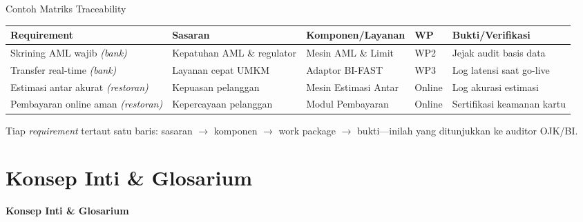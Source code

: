 \documentclass[aspectratio=169, table]{beamer}
\newcommand{\sectionframe}[1]{%
  \begin{frame}{\hfill}
    \centering
    \Huge{\textbf{#1}}
  \end{frame}
}
\newcommand{\takeaway}[1]{%
  \vspace{4pt}
  {\footnotesize #1}
}
\begin{document}
\begin{frame}{Contoh Matriks Traceability}
  \vspace{4pt}
  \scriptsize
  {\setlength{\arrayrulewidth}{0.3pt}%
  \renewcommand{\arraystretch}{1.3}%
  \begin{tabularx}{\textwidth}{@{}|p{}|p{}|p{}|p{}|X|@{}}
    \hline
    \textbf{Requirement} & \textbf{Sasaran} & \textbf{Komponen/Layanan} & \textbf{WP} & \textbf{Bukti/Verifikasi} \\
    \hline
    Skrining AML wajib \emph{(bank)} & Kepatuhan AML \& regulator & Mesin AML \& Limit & WP2 & Jejak audit basis data \\
    \hline
    Transfer real-time \emph{(bank)} & Layanan cepat UMKM & Adaptor BI-FAST & WP3 & Log latensi saat go-live \\
    \hline
    Estimasi antar akurat \emph{(restoran)} & Kepuasan pelanggan & Mesin Estimasi Antar & Online & Log akurasi estimasi \\
    \hline
    Pembayaran online aman \emph{(restoran)} & Kepercayaan pelanggan & Modul Pembayaran & Online & Sertifikasi keamanan kartu \\
    \hline
  \end{tabularx}}

  \takeaway{Tiap \emph{requirement} tertaut satu baris: sasaran $\rightarrow$
  komponen $\rightarrow$ work package $\rightarrow$ bukti---inilah yang ditunjukkan
  ke auditor OJK/BI.}
\end{frame}

\section{Konsep Inti \& Glosarium}
\sectionframe{Konsep Inti \& Glosarium}
\end{document}
